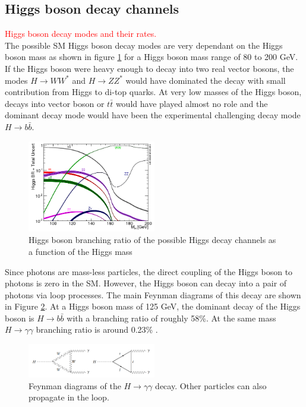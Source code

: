 \subsection{Higgs boson decay channels}
\label{chap1:EWSB:HD}
\textcolor{red}{Higgs boson decay modes and their rates. \\}
The possible SM Higgs boson decay modes are very dependant on the Higgs boson mass as shown in figure \ref{fig:chap1:EWSB:BR} for a Higgs boson mass range of 80 to 200 GeV. If the Higgs boson were heavy enough to decay into two real vector bosons, the modes $H\rightarrow WW^*$ and $ H\rightarrow ZZ^*$ would have dominated the decay with small contribution from Higgs to di-top quarks. At very low masses of the Higgs boson, decays into vector boson or $t\bar{t}$ would have played almost no role and the dominant decay mode would have been the experimental challenging decay mode $H\rightarrow b\bar{b}$.
\begin{figure}[h!]
    \centering
    \includegraphics[width=0.5\textwidth]{Ch1/Img/Higgs_Br.png}
    \caption{Higgs boson branching ratio of the possible Higgs decay channels as a function of the Higgs mass \cite{HiggsBR}}
    \label{fig:chap1:EWSB:BR}
\end{figure}
Since photons are mass-less particles, the direct coupling of the Higgs boson to photons is zero in the SM. However, the Higgs boson can decay into a pair of photons via loop processes. The main Feynman diagrams of this decay are shown in Figure \ref{fig:chap1:EWSB:Hgg}. 
At a Higgs boson mass of 125 GeV, the dominant decay of the Higgs boson is $H \rightarrow b\bar{b}$ with a branching ratio of roughly 58\%. At the same mass $H\rightarrow\gamma\gamma$ branching ratio is around 0.23\% \cite{HXSWG}.
\begin{figure}[H]
    \centering
    \includegraphics[width=0.5\textwidth]{Ch1/Img/H_to_gammagamma.png}
    \caption{Feynman diagrams of the $H\rightarrow\gamma\gamma$ decay. Other particles can also propagate in the loop.}
    \label{fig:chap1:EWSB:Hgg}
\end{figure}

